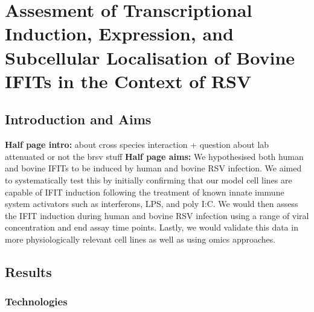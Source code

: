\chapter{Assesment of Transcriptional Induction, Expression, and Subcellular Localisation of Bovine IFITs in the Context of RSV} \label{Assesment of Transcriptional Induction, Expression, and Subcellular Localisation of Bovine IFITs in the Context of RSV}
\section{Introduction and Aims} \label{Introduction and Aims-Chapter2}
\textbf{Half page intro:}
about cross species interaction + question about lab attenuated or not the brsv stuff
\textbf{Half page aims:}
We hypothesised both human and bovine IFITs to be induced by human and bovine RSV infection. We aimed to systematically test this by initially confirming that our model cell lines are capable of IFIT induction following the treatment of known innate immune system activators such as interferons, LPS, and poly I:C. We would then assess the IFIT induction during human and bovine RSV infection using a range of viral concentration and end assay time points. Lastly, we would validate this data in more physiologically relevant cell lines as well as using omics approaches.

\section{Results} \label{Results-Chapter2}
\subsection{Technologies} \label{Technologies}
